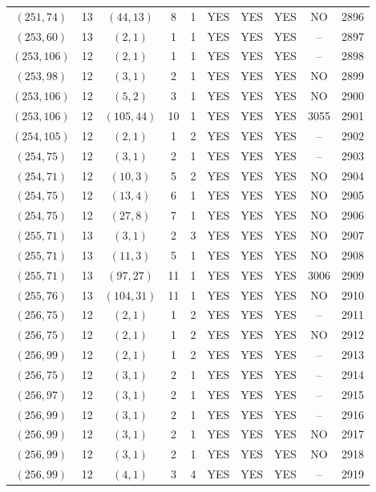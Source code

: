 \begin{longtable}{|c|c|c|c|c|c|c|c|c|c|}
$(251, 74)$ & 13 & $(44, 13)$ & 8 & 1 & YES & YES & YES & NO & 2896\\
$(253, 60)$ & 13 & $(2, 1)$ & 1 & 1 & YES & YES & YES & -- & 2897\\
$(253, 106)$ & 12 & $(2, 1)$ & 1 & 1 & YES & YES & YES & -- & 2898\\
$(253, 98)$ & 12 & $(3, 1)$ & 2 & 1 & YES & YES & YES & NO & 2899\\
$(253, 106)$ & 12 & $(5, 2)$ & 3 & 1 & YES & YES & YES & NO & 2900\\
$(253, 106)$ & 12 & $(105, 44)$ & 10 & 1 & YES & YES & YES & 3055 & 2901\\
$(254, 105)$ & 12 & $(2, 1)$ & 1 & 2 & YES & YES & YES & -- & 2902\\
$(254, 75)$ & 12 & $(3, 1)$ & 2 & 1 & YES & YES & YES & -- & 2903\\
$(254, 71)$ & 12 & $(10, 3)$ & 5 & 2 & YES & YES & YES & NO & 2904\\
$(254, 75)$ & 12 & $(13, 4)$ & 6 & 1 & YES & YES & YES & NO & 2905\\
$(254, 75)$ & 12 & $(27, 8)$ & 7 & 1 & YES & YES & YES & NO & 2906\\
$(255, 71)$ & 13 & $(3, 1)$ & 2 & 3 & YES & YES & YES & NO & 2907\\
$(255, 71)$ & 13 & $(11, 3)$ & 5 & 1 & YES & YES & YES & NO & 2908\\
$(255, 71)$ & 13 & $(97, 27)$ & 11 & 1 & YES & YES & YES & 3006 & 2909\\
$(255, 76)$ & 13 & $(104, 31)$ & 11 & 1 & YES & YES & YES & NO & 2910\\
$(256, 75)$ & 12 & $(2, 1)$ & 1 & 2 & YES & YES & YES & -- & 2911\\
$(256, 75)$ & 12 & $(2, 1)$ & 1 & 2 & YES & YES & YES & NO & 2912\\
$(256, 99)$ & 12 & $(2, 1)$ & 1 & 2 & YES & YES & YES & -- & 2913\\
$(256, 75)$ & 12 & $(3, 1)$ & 2 & 1 & YES & YES & YES & -- & 2914\\
$(256, 97)$ & 12 & $(3, 1)$ & 2 & 1 & YES & YES & YES & -- & 2915\\
$(256, 99)$ & 12 & $(3, 1)$ & 2 & 1 & YES & YES & YES & -- & 2916\\
$(256, 99)$ & 12 & $(3, 1)$ & 2 & 1 & YES & YES & YES & NO & 2917\\
$(256, 99)$ & 12 & $(3, 1)$ & 2 & 1 & YES & YES & YES & NO & 2918\\
$(256, 99)$ & 12 & $(4, 1)$ & 3 & 4 & YES & YES & YES & -- & 2919\\

\end{longtable}
